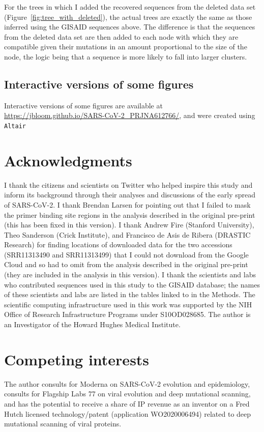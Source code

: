 \documentclass[9pt,twocolumn,twoside]{gsajnl_modified}
\begin{document}
{For the trees in which I added the recovered sequences from the deleted data set (Figure~\ref{fig:tree_with_deleted}), the actual trees are exactly the same as those inferred using the GISAID sequences above.
The difference is that the sequences from the deleted data set are then added to each node with which they are compatible given their mutations in an amount proportional to the size of the node, the logic being that a sequence is more likely to fall into larger clusters.

\subsection{Interactive versions of some figures}
Interactive versions of some figures are available at \url{https://jbloom.github.io/SARS-CoV-2_PRJNA612766/}, and were created using \texttt{Altair}~\citep{vanderplas2018altair}

\section{Acknowledgments}
I thank the citizens and scientists on Twitter who helped inspire this study and inform its background through their analyses and discussions of the early spread of SARS-CoV-2.
I thank Brendan Larsen for pointing out that I failed to mask the primer binding site regions in the analysis described in the original pre-print (this has been fixed in this version).
I thank Andrew Fire (Stanford University), Theo Sanderson (Crick Institute), and Francisco de Asis de Ribera (DRASTIC Research) for finding locations of downloaded data for the two accessions (SRR11313490 and SRR11313499) that I could not download from the Google Cloud and so had to omit from the analysis described in the original pre-print (they are included in the analysis in this version).
I thank the scientists and labs who contributed sequences used in this study to the GISAID database; the names of these scientists and labs are listed in the tables linked to in the Methods.
The scientific computing infrastructure used in this work was supported by the NIH Office of Research Infrastructure Programs under S10OD028685.
The author is an Investigator of the Howard Hughes Medical Institute.

\section{Competing interests}
The author consults for Moderna on SARS-CoV-2 evolution and epidemiology, consults for Flagship Labs 77 on viral evolution and deep mutational scanning, and has the potential to receive a share of IP revenue as an inventor on a Fred Hutch licensed technology/patent (application WO2020006494) related to deep mutational scanning of viral proteins.

}
\end{document}
